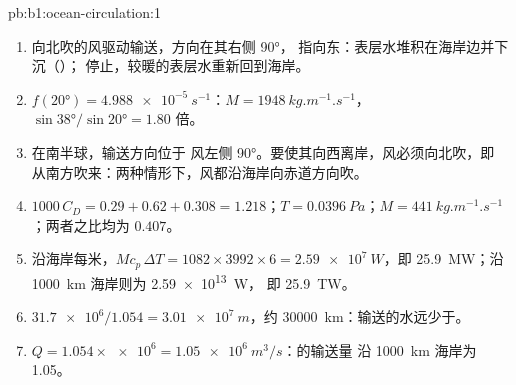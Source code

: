 \begin{solution}{pb:b1:ocean-circulation:1}
\begin{enumerate}
  \item 向北吹的风驱动输送，方向在其右侧 \ang{90}，
        指向东：表层水堆积在海岸边并下沉（）；
        停止，较暖的表层水重新回到海岸。
  \item $f(\ang{20}) = \qty{4.988e-5}{s^{-1}}$：$M = \qty{1948}{kg.m^{-1}.s^{-1}}$，
        $\sin\ang{38}/\sin\ang{20} = 1.80$ 倍。
  \item 在南半球，输送方向位于
        风左侧 \ang{90}。要使其向西离岸，风必须向北吹，即
        从南方吹来：两种情形下，风都沿海岸向赤道方向吹。
  \item $1000\,C_D = 0.29 + 0.62 + 0.308 = 1.218$；$T = \qty{0.0396}{Pa}$；$M =
        \qty{441}{kg.m^{-1}.s^{-1}}$；两者之比均为 $0.407$。
  \item 沿海岸每米，$M c_p\,\Delta T = 1082 \times 3992 \times 6 =
        \qty{2.59e7}{W}$，即 \qty{25.9}{MW}；沿 \qty{1000}{km} 海岸则为 \qty{2.59e13}{W}，
        即 \qty{25.9}{TW}。
  \item $\num{31.7e6}/1.054 = \qty{3.01e7}{m}$，约 \qty{30000}{km}：输送的水远少于。
  \item $Q = 1.054 \times \num{e6} = \qty{1.05e6}{m^3/s}$：的输送量
        沿 \qty{1000}{km} 海岸为 \qty{1.05}{\sverdrup}。
\end{enumerate}
\end{solution}
